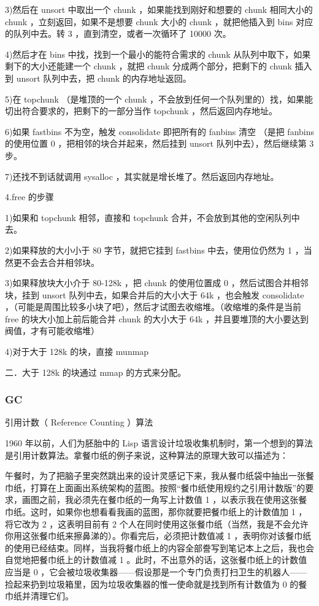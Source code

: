 \documentclass[a4paper, 11pt]{article}
\begin{document}
3)然后在 unsort 中取出一个 chunk ，如果能找到刚好和想要的 chunk 相同大小的 chunk ，立刻返回，如果不是想要 chunk 大小的 chunk ，就把他插入到 bins 对应的队列中去。转 3 ，直到清空，或者一次循环了 10000 次。

4)然后才在 bins 中找，找到一个最小的能符合需求的 chunk 从队列中取下，如果剩下的大小还能建一个 chunk ，就把 chunk 分成两个部分，把剩下的 chunk 插入到 unsort 队列中去，把 chunk 的内存地址返回。

5)在 topchunk （是堆顶的一个 chunk ，不会放到任何一个队列里的）找，如果能切出符合要求的，把剩下的一部分当作 topchunk ，然后返回内存地址。

6)如果 fastbins 不为空，触发 consolidate 即把所有的 fanbins 清空 （是把 fanbins 的使用位置 0 ，把相邻的块合并起来，然后挂到 unsort 队列中去），然后继续第 3 步。

7)还找不到话就调用 sysalloc ，其实就是增长堆了。然后返回内存地址。

4.free 的步骤

1)如果和 topchunk 相邻，直接和 topchunk 合并，不会放到其他的空闲队列中去。

2)如果释放的大小小于 80 字节，就把它挂到 fastbins 中去，使用位仍然为 1 ，当然更不会去合并相邻块。

3)如果释放块大小介于 80-128k ，把 chunk 的使用位置成 0 ，然后试图合并相邻块，挂到 unsort 队列中去，如果合并后的大小大于 64k ，也会触发 consolidate ，（可能是周围比较多小块了吧），然后才试图去收缩堆。（收缩堆的条件是当前 free 的块大小加上前后能合并 chunk 的大小大于 64k ，并且要堆顶的大小要达到阀值，才有可能收缩堆）

4)对于大于 128k 的块，直接 munmap 

二．大于 128k 的块通过 mmap 的方式来分配。 
\subsubsection{GC}
引用计数（ Reference Counting ）算法

1960 年以前，人们为胚胎中的 Lisp 语言设计垃圾收集机制时，第一个想到的算法是引用计数算法。拿餐巾纸的例子来说，这种算法的原理大致可以描述为：

午餐时，为了把脑子里突然跳出来的设计灵感记下来，我从餐巾纸袋中抽出一张餐巾纸，打算在上面画出系统架构的蓝图。按照“餐巾纸使用规约之引用计数版”的要求，画图之前，我必须先在餐巾纸的一角写上计数值 1 ，以表示我在使用这张餐巾纸。这时，如果你也想看看我画的蓝图，那你就要把餐巾纸上的计数值加 1 ，将它改为 2 ，这表明目前有 2 个人在同时使用这张餐巾纸（当然，我是不会允许你用这张餐巾纸来擦鼻涕的）。你看完后，必须把计数值减 1 ，表明你对该餐巾纸的使用已经结束。同样，当我将餐巾纸上的内容全部誊写到笔记本上之后，我也会自觉地把餐巾纸上的计数值减 1 。此时，不出意外的话，这张餐巾纸上的计数值应当是 0 ，它会被垃圾收集器——假设那是一个专门负责打扫卫生的机器人——捡起来扔到垃圾箱里，因为垃圾收集器的惟一使命就是找到所有计数值为 0 的餐巾纸并清理它们。
\end{document}
